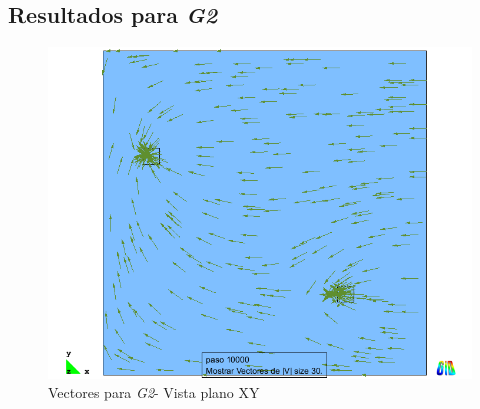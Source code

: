 \documentclass[10pt,a4paper,final]{article}
\begin{document}
\subsection{Resultados para \emph{G2}}
%
\begin{figure}[tbhp]
\centerline{\includegraphics[scale=0.4]{img/200m/resul/200_xy_vectores}}
\caption{Vectores para \emph{G2}- Vista plano XY}
\label{200_xy_vectores}
\end{figure}
%
\end{document}
